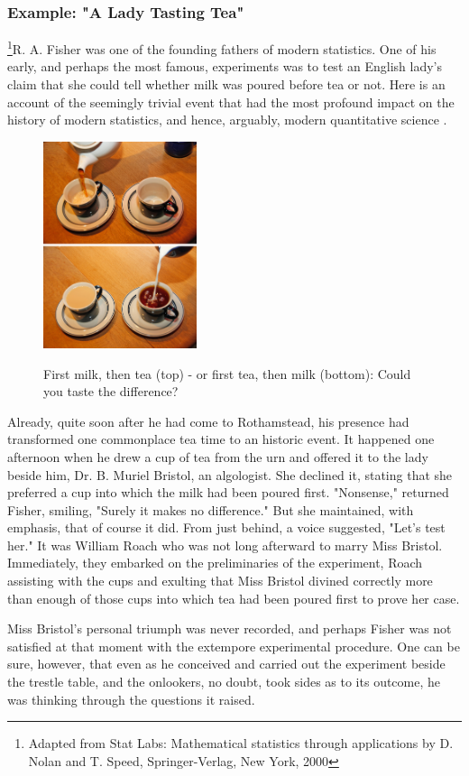 \subsubsection{Example: "A Lady Tasting Tea"}

\footnote{Adapted from Stat Labs: Mathematical statistics through applications by D. Nolan and T. Speed, Springer-Verlag, New York, 2000}R. A. Fisher was one of the founding fathers of modern statistics. One of his early, and perhaps the most famous, experiments was to test an English lady's claim that she could tell whether milk was poured before tea or not. Here is an account of the seemingly trivial event that had the most profound impact on the history of modern statistics, and hence, arguably, modern quantitative science \cite{Box1978}.

\begin{figure}
  \centering
  \includegraphics[width=0.4\textwidth]{../Images/TeaFirst_MilkFirst.jpg}\\
  \caption{First milk, then tea (top) - or first tea, then milk (bottom): Could you taste the difference?}\label{fig:ALadyTastingTea}
\end{figure}

\begin{adjustwidth}{2.5em}{2.5em}
    Already, quite soon after he had come to Rothamstead, his presence had transformed one commonplace tea time to an historic event. It happened one afternoon when he drew a cup of tea from the urn and offered it to the lady beside him, Dr. B. Muriel Bristol, an algologist. She declined it, stating that she preferred a cup into which the milk had been poured first. "Nonsense," returned Fisher, smiling, "Surely it makes no difference." But she maintained, with emphasis, that of course it did. From just behind, a voice suggested, "Let's test her." It was William Roach who was not long afterward to marry Miss Bristol. Immediately, they embarked on the preliminaries of the experiment, Roach assisting with the cups and exulting that Miss Bristol divined correctly more than enough of those cups into which tea had been poured first to prove her case.

    Miss Bristol's personal triumph was never recorded, and perhaps Fisher was not satisfied at that moment with the extempore experimental procedure. One can be sure, however, that even as he conceived and carried out the experiment beside the trestle table, and the onlookers, no doubt, took sides as to its outcome, he was thinking through the questions it raised.
\end{adjustwidth}

